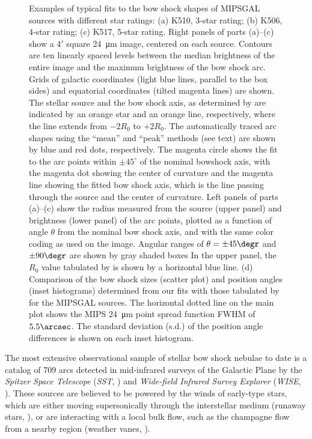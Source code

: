 \begin{figure}
  \caption[]{Examples of typical fits to the bow shock shapes of
    MIPSGAL sources with different star ratings: (a) K510, 3-star
    rating; (b) K506, 4-star rating; (c) K517, 5-star rating.  Right
    panels of parts (a)--(c) show a 4\('\) square \SI{24}{\um} image,
    centered on each source.  Contours are ten linearly spaced levels
    between the median brightness of the entire image and the maximum
    brightness of the bow shock arc. Grids of galactic coordinates
    (light blue lines, parallel to the box sides) and equatorial
    coordinates (tilted magenta lines) are shown.  The stellar source
    and the bow shock axis, as determined by \citet{Kobulnicky:2016a}
    are indicated by an orange star and an orange line, respectively,
    where the line extends from \(-2 R_0\) to \(+2 R_0\).  The
    automatically traced arc shapes using the ``mean'' and ``peak''
    methods (see text) are shown by blue and red dots, respectively.
    The magenta circle shows the fit to the arc points within
    \(\pm 45^\circ\) of the nominal bowshock axis, with the magenta dot
    showing the center of curvature and the magenta line showing the
    fitted bow shock axis, which is the line passing through the
    source and the center of curvature.  Left panels of parts (a)--(c)
    show the radius measured from the source (upper panel) and
    brightness (lower panel) of the arc points, plotted as a function
    of angle \(\theta\) from the nominal bow shock axis, and with the same
    color coding as used on the image. Angular ranges of
    \(\theta = \pm 45\degr\) and \(\pm 90\degr\) are shown by gray shaded
    boxes In the upper panel, the \(R_0\) value tabulated by
    \citet{Kobulnicky:2016a} is shown by a horizontal blue line. (d)
    Comparison of the bow shock sizes (scatter plot) and position
    angles (inset histograms) determined from our fits with those
    tabulated by \citet{Kobulnicky:2016a} for the MIPSGAL sources.
    The horizontal dotted line on the main plot shows the MIPS
    \SI{24}{\um} point spread function FWHM of \(5.5\arcsec\).  The
    standard deviation (s.d.) of the position angle differences is
    shown on each inset histogram.}
  \label{fig:mipsgal-examples}
\end{figure}


The most extensive observational sample of stellar bow shock nebulae
to date is a catalog of 709 arcs \citep{Kobulnicky:2016a} detected in
mid-infrared surveys of the Galactic Plane by the \textit{Spitzer
  Space Telescope} (\textit{SST}, \citealp{Werner:2004a}) and
\textit{Wide-field Infrared Survey Explorer} (\textit{WISE},
\citealp{Wright:2010a}).  These sources are believed to be powered by
the winds of early-type stars, which are either moving supersonically
through the interstellar medium (runaway stars,
\citealp{Gvaramadze:2008a}), or are interacting with a local bulk
flow, such as the champagne flow from a nearby \hii{} region (weather
vanes, \citealp{Povich:2008a}).

